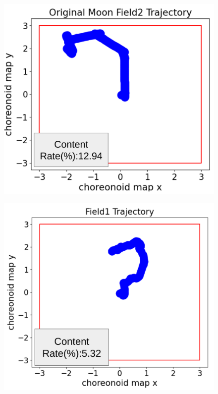 \documentclass[a4paper,twocolumn,9pt]{jsarticle}
\begin{document}
\begin{figure}[b]
  \centering
  \begin{minipage}[b]{0.48\linewidth}
    \centering
    \includegraphics[keepaspectratio, scale=0.10]{figures/origin_moon_field2.png}
    \label{fig:result1}
  \end{minipage}
  \begin{minipage}[b]{0.48\linewidth}
    \centering
    \includegraphics[keepaspectratio, scale=0.105]{figures/field1_trajectry.png}

\end{minipage}
\end{figure}
\end{document}
